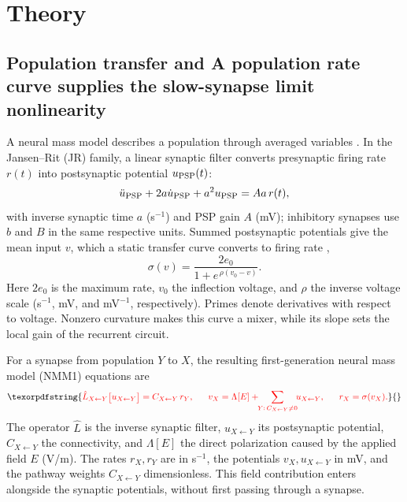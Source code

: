 \documentclass[11pt,a4paper]{article}
\newcommand{\Sig}{\sigma}
\providecommand{\DIFaddtex}[1]{{\protect\color{blue} \sf #1}} %
\providecommand{\DIFdeltex}[1]{{\protect\color{red} \scriptsize #1}} %
\providecommand{\DIFaddbegin}{} %
\providecommand{\DIFaddend}{} %
\providecommand{\DIFdelbegin}{} %
\providecommand{\DIFdelend}{} %
\providecommand{\DIFadd}[1]{\texorpdfstring{\DIFaddtex{#1}}{#1}} %
\providecommand{\DIFdel}[1]{\texorpdfstring{\DIFdeltex{#1}}{}} %
\begin{document}
\section{Theory}

\subsection{\DIFdelbegin \DIFdel{Population transfer and }\DIFdelend \DIFaddbegin \DIFadd{A population rate curve supplies }\DIFaddend the \DIFdelbegin \DIFdel{slow-synapse limit}\DIFdelend \DIFaddbegin \DIFadd{nonlinearity}\DIFaddend }\label{sec:nmm}
A neural mass model describes a population through averaged variables
\cite{ruffini2025rosetta,jansen1995}. In the Jansen--Rit (JR) family, a linear synaptic
filter converts presynaptic firing rate $r(t)$ into postsynaptic potential $u_{\rm PSP}(t)$:
\[
\ddot u_{\rm PSP}+2a\dot u_{\rm PSP}+a^2u_{\rm PSP}=Aa\,r(t),
\]
with inverse synaptic time $a$ (s$^{-1}$) and PSP gain $A$ (mV); inhibitory synapses use
$b$ and $B$ in the same respective units. Summed postsynaptic potentials give the mean input $v$, which
a static transfer curve converts to firing rate \cite{wilsoncowan1972},
\begin{equation}
\Sig(v)=\frac{2e_0}{1+e^{\,\rho(v_0-v)}} .
\label{eq:sigmoid}
\end{equation}
Here $2e_0$ is the maximum rate, $v_0$ the inflection voltage, and $\rho$ the inverse
voltage scale (s$^{-1}$, mV, and mV$^{-1}$, respectively). Primes denote
derivatives with respect to voltage. Nonzero curvature makes this curve a mixer, while its slope sets
the local gain of the recurrent circuit.

\DIFdelbegin \DIFdel{For a synapse from population $Y$ to $X$, the resulting first-generation neural
mass model (NMM1) equations are
\cite{ruffini2025rosetta}
}\begin{displaymath}
\DIFdel{\hat L_{X\leftarrow Y}\big[u_{X\leftarrow Y}\big]=C_{X\leftarrow Y}\,r_Y,\qquad
v_X=\Lambda[E]+\!\!\sum_{Y:\,C_{X\leftarrow Y}\neq0}\!\!u_{X\leftarrow Y},\qquad
r_X=\Sig(v_X).
}\end{displaymath}%
\DIFdel{The operator $\hat L$ is the inverse synaptic filter, $u_{X\leftarrow Y}$ its
postsynaptic potential, $C_{X\leftarrow Y}$ the connectivity, and $\Lambda[E]$
the direct polarization caused by the applied field $E$ (V/m). The rates $r_X,r_Y$
are in s$^{-1}$, the potentials $v_X,u_{X\leftarrow Y}$ in mV, and the
pathway weights $C_{X\leftarrow Y}$ dimensionless. This field contribution enters
alongside the synaptic potentials, without first passing through a synapse.
}%
\end{document}
